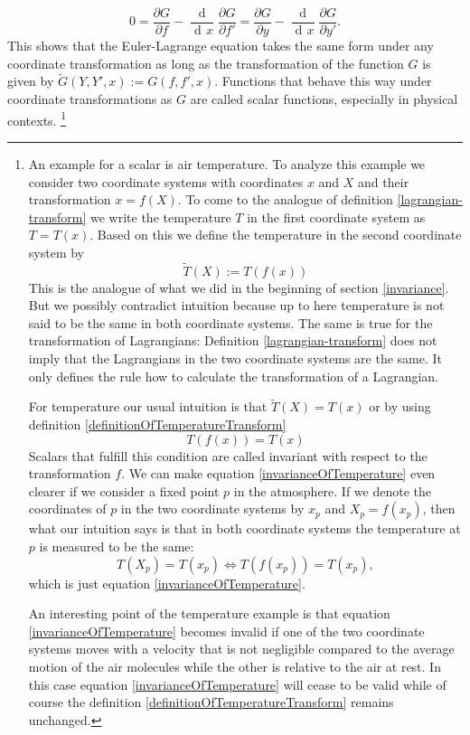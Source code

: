 \documentclass[prb,preprint]{revtex4-1}
\DeclareMathOperator{\dd}{d\!}
\DeclareMathOperator{\ddd}{\mathrm{d}}
\begin{document}
\begin{equation}
0 = \frac{\partial G}{\partial f} - \frac{\ddd}{\dd x} \frac{\partial G}{\partial f'}
= \frac{\partial G}{\partial y} - \frac{\ddd}{\dd x} \frac{\partial G}{\partial y'}.
\end{equation}
This shows that the Euler-Lagrange equation takes the same form under any coordinate transformation as long as the transformation of the function $G$ is given by $\widetilde{G}(Y,Y',x) := G(f,f',x)$. Functions that behave this way under coordinate transformations as $G$ are called scalar functions, especially in physical contexts.
\footnote{An example for a scalar is air temperature. To analyze this example we consider two coordinate systems with coordinates $x$ and $X$ and their transformation $x=f(X)$.
To come to the analogue of definition \eqref{lagrangian-transform} we write the temperature $T$ in the first coordinate system as $T=T(x)$.
Based on this we define the temperature in the second coordinate system by
\begin{equation} \label{definitionOfTemperatureTransform}
  \tilde{T}(X) := T(f(x))
\end{equation}
This is the analogue of what we did in the beginning of section \ref{invariance}.
But we possibly contradict intuition because up to here temperature is not said to be the same in both coordinate systems.
The same is true for the transformation of Lagrangians: Definition \eqref{lagrangian-transform} does not imply that the Lagrangians in the two coordinate systems are the same.
It only defines the rule how to calculate the transformation of a Lagrangian.

For temperature our usual intuition is that $\tilde{T}(X) = T(x)$ or by using definition \eqref{definitionOfTemperatureTransform}
\begin{equation} \label{invarianceOfTemperature}
  T(f(x)) = T(x)
\end{equation}
Scalars that fulfill this condition are called invariant with respect to the transformation $f$.
We can make equation \eqref{invarianceOfTemperature} even clearer if we consider a fixed point $p$ in the atmosphere.
If we denote the coordinates of $p$ in the two coordinate systems by $x_p$ and $X_p=f(x_p)$,
then what our intuition says is that in both coordinate systems the temperature at $p$ is measured to be the same:
\begin{equation}
  T(X_p)=T(x_p) \iff T(f(x_p))=T(x_p),
\end{equation}
which is just equation \eqref{invarianceOfTemperature}.

An interesting point of the temperature example is that equation \eqref{invarianceOfTemperature} becomes invalid if one of the two coordinate systems moves with a velocity that is not negligible compared to the average motion of the air molecules while the other is relative to the air at rest.
In this case equation \eqref{invarianceOfTemperature} will cease to be valid while of course the definition \eqref{definitionOfTemperatureTransform} remains unchanged.
}
\end{document}
